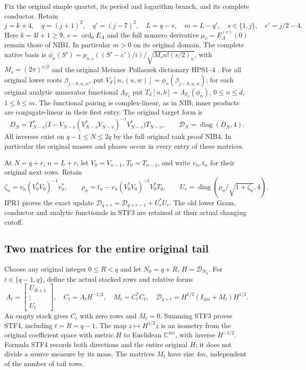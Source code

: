 \documentclass[11pt,a4paper]{article}
\begin{document}
Fix the original simple quartet, its period and logarithm branch, and its
complete conductor. Retain
\[
 j=k+4,\quad q=(j+1)^2,\quad q'=(j-7)^2,\quad
 L=q-v,\quad m=L-q',\quad s\in\{1,j\},\quad c'=j/2-4 .       \tag{STF1}
\]
Here $k=4l+1\ge9$, $v=\operatorname{ord}_0 E_A$ and the full
nonzero derivative $\mu_v=E_A^{(v)}(0)$ remain those of NIB1.
In particular $m>0$ on its original domain. The complete native basis is
$\phi_n(S')=p_{n,s}((S'-c')/i)/\sqrt{M_sn!(s/2)_n}$, with
$M_s=(2\pi)^{s/2}$ and the original Meixner--Pollaczek dictionary
HPS1--4 \cite[eqs.~(18.19.8)--(18.19.9), (18.22.8)]{human:dlmf18}.
For all original lower roots $\beta_{j-8,u,w}$, put
$V_d[n,(u,w)]=\phi_n(\beta_{j-8,u,w})$; for each original analytic
numerator functional $\Lambda_{F_b}$ put
$T_d[n,b]=\Lambda_{F_b}(\phi_n)$, $0\le n\le d$, $1\le b\le m$.
The functional pairing is complex-linear, as in NIB; inner products
are conjugate-linear in their first entry. The original target form is
\[
 D_N=T_{N-v}^*\bigl(I-V_{N-v}(V_{N-v}^*V_{N-v})^{-1}
                         V_{N-v}^*\bigr)T_{N-v},
 \qquad \mathcal D_N=\operatorname{diag}(D_N,4).             \tag{STF2}
\]
All inverses exist on $q-1\le N\le2q$ by the full original rank
proof NIB4. In particular the original masses and phases occur in
every entry of these matrices.

At $N=q+r$, $n=L+r$, let $V_0=V_{n-1}$, $T_0=T_{n-1}$, and
write $v_n,t_n$ for their original next rows. Retain
\[
 \zeta_n=v_n(V_0^*V_0)^{-1}v_n^*,\qquad
 \rho_n=t_n-v_n(V_0^*V_0)^{-1}V_0^*T_0,
 \qquad U_r=\operatorname{diag}
              (\rho_n/\sqrt{1+\zeta_n},4).                \tag{STF3}
\]
IPR1 proves the exact update
$\mathcal D_{q+r}=\mathcal D_{q+r-1}+U_r^*U_r$.
The old lower Gram, conductor and analytic functionals in STF3 are
retained at their actual changing cutoff.

\subsection{Two matrices for the entire original tail}
Choose any original integer $0\le R<q$ and let
$N_0=q+R$, $H=\mathcal D_{N_0}$.
For $t\in\{q-1,q\}$, define the actual stacked rows and relative forms
\[
 A_t=\begin{bmatrix}U_{R+1}\\ \vdots\\ U_t\end{bmatrix},
 \quad C_t=A_tH^{-1/2},\quad M_t=C_t^*C_t,
 \quad \mathcal D_{q+t}=H^{1/2}(I_{4m}+M_t)H^{1/2}.          \tag{STF4}
\]
An empty stack gives $C_t$ with zero rows and $M_t=0$.
Summing STF3 proves STF4, including $t=R=q-1$.
The map $z\mapsto H^{1/2}z$ is an isometry from the original
coefficient space with metric $H$ to Euclidean $\mathbb C^{4m}$,
with inverse $H^{-1/2}$. Formula STF4 records both directions and
the entire original $H$; it does not divide a source measure by its mass.
The matrices $M_t$ have size $4m$, independent of the number of tail rows.
\end{document}
